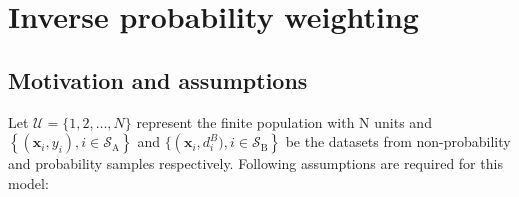 \documentclass[
  letterpaper,
  DIV=11,
  numbers=noendperiod]{scrreprt}
\author{}
\date{}
\begin{document}
\ifdefined\Shaded\renewenvironment{Shaded}{\begin{tcolorbox}[borderline west={3pt}{0pt}{shadecolor}, enhanced, interior hidden, breakable, sharp corners, frame hidden, boxrule=0pt]}{\end{tcolorbox}}\fi

\hypertarget{inverse-probability-weighting}{%
\chapter{Inverse probability
weighting}\label{inverse-probability-weighting}}

\newcommand{\bSigma}{\boldsymbol{\Sigma}}
\newcommand{\bOmega}{\boldsymbol{\Omega}}
\newcommand{\bTheta}{\boldsymbol{\Theta}}
\newcommand{\bPi}{\boldsymbol{\Pi}}
\newcommand{\bbeta}{\boldsymbol{\beta}}
\newcommand{\balpha}{\boldsymbol{\alpha}}
\newcommand{\brho}{\boldsymbol{\rho}}
\newcommand{\beps}{\boldsymbol{\epsilon}}
\newcommand{\blambda}{\boldsymbol{\lambda}}
\newcommand{\bgamma}{\boldsymbol{\gamma}}
\newcommand{\btheta}{\boldsymbol{\theta}}
\newcommand{\bmu}{\boldsymbol{\mu}}
\newcommand{\bpi}{\boldsymbol{\pi}}
\newcommand{\bphi}{\boldsymbol{\phi}}
\newcommand{\bPhi}{\boldsymbol{\Phi}}
\newcommand{\boldeta}{\boldsymbol{\eta}}
\newcommand{\bx}{\boldsymbol{x}}
\newcommand{\bD}{\boldsymbol{D}}
\newcommand{\bV}{\boldsymbol{V}}
\newcommand{\bv}{\boldsymbol{v}}
\newcommand{\bY}{\boldsymbol{Y}}
\newcommand{\bA}{\boldsymbol{A}}
\newcommand{\bB}{\boldsymbol{B}}
\newcommand{\bR}{\boldsymbol{R}}
\newcommand{\bM}{\boldsymbol{M}}
\newcommand{\bI}{\boldsymbol{I}}
\newcommand{\bC}{\boldsymbol{C}}
\newcommand{\bW}{\boldsymbol{W}}
\newcommand{\bw}{\boldsymbol{w}}
\newcommand{\bd}{\boldsymbol{d}}
\newcommand{\bT}{\boldsymbol{T}}
\newcommand{\bt}{\boldsymbol{t}}
\newcommand{\bZ}{\boldsymbol{Z}}
\newcommand{\bX}{\boldsymbol{X}}
\newcommand{\bz}{\boldsymbol{z}}
\newcommand{\by}{\boldsymbol{y}}
\newcommand{\br}{\boldsymbol{r}}
\newcommand{\bp}{\boldsymbol{p}}
\newcommand{\bb}{\boldsymbol{b}}
\newcommand{\bZero}{\boldsymbol{0}}
\newcommand{\bOne}{\boldsymbol{1}}

\hypertarget{motivation-and-assumptions}{%
\section{Motivation and assumptions}\label{motivation-and-assumptions}}

Let \(\mathcal{U}=\{1,2, \ldots, N\}\) represent the finite population
with N units and
\(\left\{\left(\bx_i, y_i\right), i \in \mathcal{S}_{\mathrm{A}}\right\}\)
and \(\{\left(\bx_i, d_i^B), i \in \mathcal{S}_{\mathrm{B}}\right\}\) be
the datasets from non-probability and probability samples respectively.
Following assumptions are required for this model:
\end{document}
